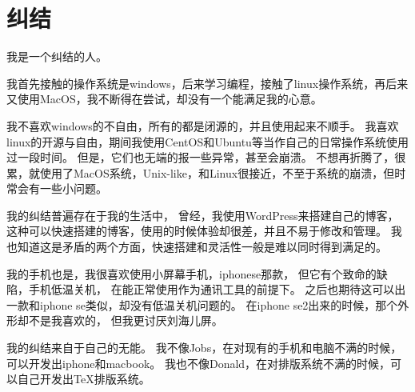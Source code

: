 
\chapter{纠结}

我是一个纠结的人。

我首先接触的操作系统是windows，后来学习编程，接触了linux操作系统，再后来又使用MacOS，我不断得在尝试，却没有一个能满足我的心意。

我不喜欢windows的不自由，所有的都是闭源的，并且使用起来不顺手。
我喜欢linux的开源与自由，期间我使用CentOS和Ubuntu等当作自己的日常操作系统使用过一段时间。
但是，它们也无端的报一些异常，甚至会崩溃。
不想再折腾了，很累，就使用了MacOS系统，Unix-like，和Linux很接近，不至于系统的崩溃，但时常会有一些小问题。


我的纠结普遍存在于我的生活中，
曾经，我使用WordPress来搭建自己的博客，
这种可以快速搭建的博客，使用的时候体验却很差，并且不易于修改和管理。
我也知道这是矛盾的两个方面，快速搭建和灵活性一般是难以同时得到满足的。

我的手机也是，我很喜欢使用小屏幕手机，iphonese那款，
但它有个致命的缺陷，手机低温关机，
在能正常使用作为通讯工具的前提下。
之后也期待这可以出一款和iphone se类似，却没有低温关机问题的。
在iphone se2出来的时候，那个外形却不是我喜欢的，
但我更讨厌刘海儿屏。


我的纠结来自于自己的无能。
我不像Jobs，在对现有的手机和电脑不满的时候，可以开发出iphone和macbook。
我也不像Donald，在对排版系统不满的时候，可以自己开发出TeX排版系统。



